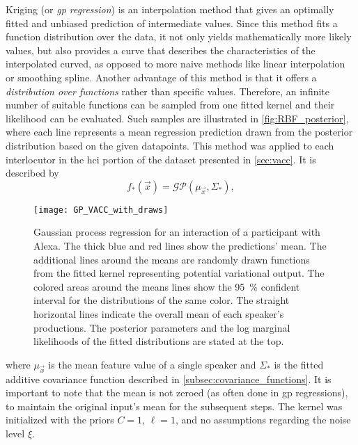 Kriging (or \textit{\acl{gp} regression}) is an interpolation method that gives an optimally fitted and unbiased prediction of intermediate values.
Since this method fits a function distribution over the data, it not only yields mathematically more likely values, but also provides a curve that describes the characteristics of the interpolated curved, as opposed to more naive methods like linear interpolation or smoothing spline.
Another advantage of this method is that it offers a \textit{distribution over functions} rather than specific values.
Therefore, an infinite number of suitable functions can be sampled from one fitted kernel and their likelihood can be evaluated.
Such samples are illustrated in \cref{fig:RBF_posterior}, where each line represents a mean regression prediction drawn from the posterior distribution based on the given datapoints.
This method was applied to each interlocutor in the \ac{hci} portion of the dataset presented in \cref{sec:vacc}.
It is described by
%
\begin{equation}
	\label{eq:gp_function_prediction}
	f_*(\vec{x}) = \mathcal{GP}(\mu_{\vec{x}}, \Sigma_*),
\end{equation}
\noindent
%
\begin{figure}[t]
	\centering
	\texttt{[image: GP\_VACC\_with\_draws]}
	\caption[Gaussian process regression on a conversation with Alexa]
		{Gaussian process regression for an interaction of a participant with Alexa.
		The thick blue and red lines show the predictions' mean.
		The additional lines around the means are randomly drawn functions from the fitted kernel representing potential variational output.
		The colored areas around the means lines show the \SI{95}{\percent} confident interval for the distributions of the same color.
		The straight horizontal lines indicate the overall mean of each speaker's productions.
		The posterior parameters and the log marginal likelihoods of the fitted distributions are stated at the top.}
	\label{fig:gp_vacc}
\end{figure}
%
where $\mu_{\vec{x}}$ is the mean feature value of a single speaker and $\Sigma_*$ is the fitted additive covariance function described in \cref{subsec:covariance_functions}.
It is important to note that the mean is not zeroed (as often done in \ac{gp} regressions), to maintain the original input's mean for the subsequent steps.
The kernel was initialized with the priors $C = 1$, $\ell = 1$, and no assumptions regarding the noise level $\xi$.
